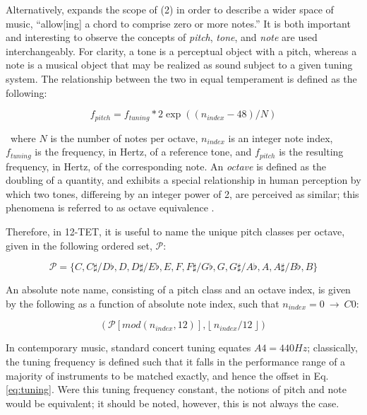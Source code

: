 Alternatively, \cite{Harte2010} expands the scope of (2) in order to describe a wider space of music, ``allow[ing] a chord to comprise zero or more notes.''
It is both important and interesting to observe the concepts of \emph{pitch}, \emph{tone}, and \emph{note} are used interchangeably.
For clarity, a tone is a perceptual object with a pitch, whereas a note is a musical object that may be realized as sound subject to a given tuning system.
The relationship between the two in equal temperament is defined as the following:

\begin{equation}
\label{eq:tuning}
f_{pitch} = f_{tuning} * 2 \exp((n_{index} - 48) / N)
\end{equation}

\noindent~where $N$ is the number of notes per octave, $n_{index}$ is an integer note index, $f_{tuning}$ is the frequency, in Hertz, of a reference tone, and $f_{pitch}$ is the resulting frequency, in Hertz, of the corresponding note.
An \emph{octave} is defined as the doubling of a quantity, and exhibits a special relationship in human perception by which two tones, differeing by an integer power of 2, are perceived as similar; this phenomena is referred to as octave equivalence \cite{?}.

Therefore, in 12-TET, it is useful to name the unique pitch classes per octave, given in the following ordered set, $\mathcal{P}$:

\begin{equation}
\label{eq:pitch_classes}
\mathcal{P} = \{C, C\sharp / D\flat, D, D\sharp / E\flat, E, F, F\sharp / G\flat, G, G\sharp / A\flat, A, A\sharp / B\flat, B\}
\end{equation}

An absolute note name, consisting of a pitch class and an octave index, is given by the following as a function of absolute note index, such that $n_{index}=0~\to~C0$:

\begin{equation}
(\mathcal{P}[mod(n_{index}, 12)], \lfloor~n_{index} / 12~\rfloor)
\end{equation}

In contemporary music, standard concert tuning equates $A4=440Hz$; classically, the tuning frequency is defined such that it falls in the performance range of a majority of instruments to be matched exactly, and hence the offset in Eq. \ref{eq:tuning}.
Were this tuning frequency constant, the notions of pitch and note would be equivalent; it should be noted, however, this is not always the case.

